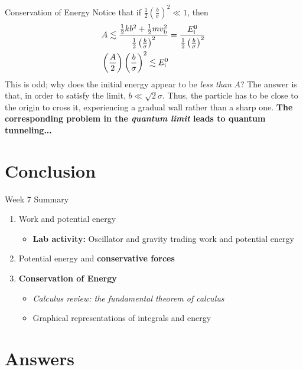 \documentclass{beamer}
\begin{document}
\begin{frame}{Conservation of Energy}
\small Notice that if $\frac{1}{2}\left(\frac{b}{\sigma}\right)^2 \ll 1$, then \ \\ \vspace{0.5cm}
\begin{align}
A \lesssim \frac{\frac{1}{2}kb^2 + \frac{1}{2}m v_{\rm b}^2}{\frac{1}{2}\left(\frac{b}{\sigma}\right)^2} &= \frac{E_{\rm i}^0}{\frac{1}{2}\left(\frac{b}{\sigma}\right)^2} \\
\left(\frac{A}{2}\right)\left(\frac{b}{\sigma}\right)^2 \lesssim E_{\rm i}^0
\end{align}
This is odd; why does the initial energy \alert{appear to be \textit{less than} $A$?}  The answer is that, in order to satisfy the limit, $b \ll \sqrt{2}\sigma$.  Thus, the particle has to be close to the origin to cross it, experiencing a gradual wall rather than a sharp one.  \textbf{The corresponding problem in the \textit{quantum limit} leads to quantum tunneling...} 
\end{frame}

\section{Conclusion}

\begin{frame}{Week 7 Summary}
\begin{enumerate}
\item \alert{Work} and \alert{potential energy}
\begin{itemize}
\item \textbf{Lab activity:} Oscillator and gravity trading work and potential energy
\end{itemize}
\item Potential energy and \textbf{conservative forces}
\item \alert{\textbf{Conservation of Energy}}
\begin{itemize}
\item \textit{Calculus review: the fundamental theorem of calculus}
\item Graphical representations of integrals and energy
\end{itemize}
\end{enumerate}
\end{frame}

\section{Answers}
\end{document}
